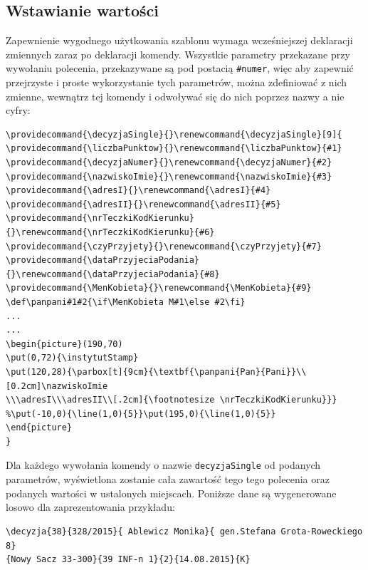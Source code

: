 \subsection{Wstawianie wartości}

Zapewnienie wygodnego użytkowania szablonu wymaga wcześniejszej deklaracji zmiennych zaraz po deklaracji komendy. Wszystkie parametry przekazane przy wywołaniu polecenia, przekazywane są pod postacią \texttt{\#numer}, więc aby zapewnić przejrzyste i proste wykorzystanie tych parametrów, można zdefiniować z nich zmienne, wewnątrz tej komendy i odwoływać się do nich poprzez nazwy a nie cyfry:

 \begin{lstlisting}
\providecommand{\decyzjaSingle}{}\renewcommand{\decyzjaSingle}[9]{
\providecommand{\liczbaPunktow}{}\renewcommand{\liczbaPunktow}{#1}
\providecommand{\decyzjaNumer}{}\renewcommand{\decyzjaNumer}{#2}
\providecommand{\nazwiskoImie}{}\renewcommand{\nazwiskoImie}{#3}
\providecommand{\adresI}{}\renewcommand{\adresI}{#4}
\providecommand{\adresII}{}\renewcommand{\adresII}{#5}
\providecommand{\nrTeczkiKodKierunku}{}\renewcommand{\nrTeczkiKodKierunku}{#6}
\providecommand{\czyPrzyjety}{}\renewcommand{\czyPrzyjety}{#7}
\providecommand{\dataPrzyjeciaPodania}{}\renewcommand{\dataPrzyjeciaPodania}{#8}
\providecommand{\MenKobieta}{}\renewcommand{\MenKobieta}{#9}
\def\panpani#1#2{\if\MenKobieta M#1\else #2\fi}
...
...
\begin{picture}(190,70)
\put(0,72){\instytutStamp}
\put(120,28){\parbox[t]{9cm}{\textbf{\panpani{Pan}{Pani}}\\[0.2cm]\nazwiskoImie
\\\adresI\\\adresII\\[.2cm]{\footnotesize \nrTeczkiKodKierunku}}}
%\put(-10,0){\line(1,0){5}}\put(195,0){\line(1,0){5}}
\end{picture}
}
 \end{lstlisting}

Dla  każdego wywołania komendy o nazwie \texttt{decyzjaSingle} od podanych parametrów, wyświetlona zostanie cała zawartość tego tego polecenia oraz podanych wartości w ustalonych miejscach. Poniższe dane są wygenerowane losowo dla zaprezentowania przykładu:
 \begin{lstlisting}
\decyzja{38}{328/2015}{ Ablewicz Monika}{ gen.Stefana Grota-Roweckiego 8}
{Nowy Sacz 33-300}{39 INF-n 1}{2}{14.08.2015}{K}
 \end{lstlisting}
 
 
 
